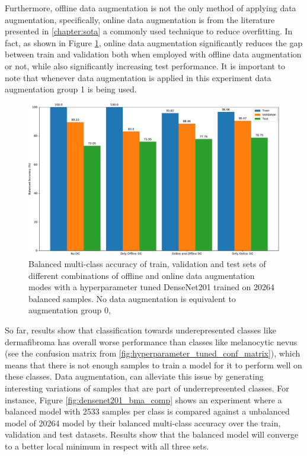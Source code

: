     Furthermore, offline data augmentation is not the only method of applying data augmentation, specifically, online data augmentation is from the literature presented in \autoref{chapter:sota} a commonly used technique to reduce overfitting. In fact, as shown in Figure \ref{fig:data_aug_mode_bal_acc_comp}, online data augmentation significantly reduces the gap between train and validation both when employed with offline data augmentation or not, while also significantly increasing test performance. It is important to note that whenever data augmentation is applied in this experiment data augmentation group 1 is being used. \par
    
    \begin{figure}[ht]
        \centering
        \includegraphics[width=\textwidth]{figs/data_aug_mode_bal_acc_comp.pdf}
        \caption{Balanced multi-class accuracy of train, validation and test sets of different combinations of offline and online data augmentation modes with a hyperparameter tuned DenseNet201 trained on 20264 balanced samples. No data augmentation is equivalent to augmentation group 0, }
        \label{fig:data_aug_mode_bal_acc_comp}
    \end{figure}
    
    So far, results show that classification towards underepresented classes like dermafibroma has overall worse performance than classes like melanocytic nevus (see the confusion matrix from \ref{fig:hyperparameter_tuned_conf_matrix}), which means that there is not enough samples to train a model for it to perform well on these classes. Data augmentation, can alleviate this issue by generating interesting variations of samples that are part of underrepresented classes. For instance, Figure \ref{fig:densenet201_bma_comp} shows an experiment where a balanced model with 2533 samples per class is compared against a unbalanced model of 20264 model by their balanced multi-class accuracy over the train, validation and test datasets. Results show that the balanced model will converge to a better local minimum in respect with all three sets. \par
    
